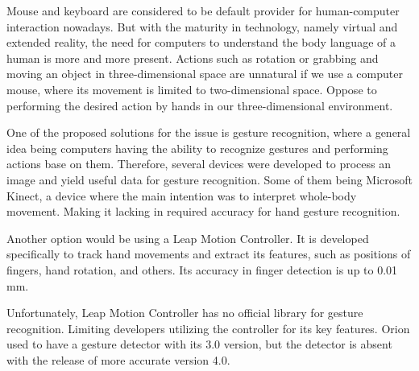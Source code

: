 Mouse and keyboard are considered to be default provider for human-computer interaction nowadays. But with the maturity in technology, namely virtual and extended reality, the need for computers to understand the body language of a human is more and more present. Actions such as rotation or grabbing and moving an object in three-dimensional space are unnatural if we use a computer mouse, where its movement is limited to two-dimensional space. Oppose to performing the desired action by hands in our three-dimensional environment.

One of the proposed solutions for the issue is gesture recognition, where a general idea being computers having the ability to recognize gestures and performing actions base on them. Therefore, several devices were developed to process an image and yield useful data for gesture recognition. Some of them being Microsoft Kinect, a device where the main intention was to interpret whole-body movement. Making it lacking in required accuracy for hand gesture recognition. 

Another option would be using a Leap Motion Controller. It is developed specifically to track hand movements and extract its features, such as positions of fingers, hand rotation, and others. Its accuracy in finger detection is up to 0.01 mm.

Unfortunately, Leap Motion Controller has no official library for gesture recognition. Limiting developers utilizing the controller for its key features. Orion used to have a gesture detector with its 3.0 version, but the detector is absent with the release of more accurate version 4.0.